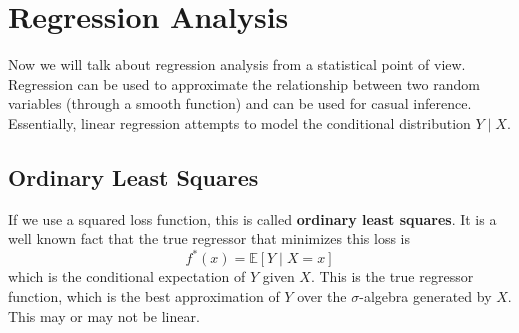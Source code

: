 \documentclass{article}
\begin{document}


\section{Regression Analysis}

    Now we will talk about regression analysis from a statistical point of view. Regression can be used to approximate the relationship between two random variables (through a smooth function) and can be used for casual inference. Essentially, linear regression attempts to model the conditional distribution $Y \mid X$. 

  \subsection{Ordinary Least Squares}

    If we use a squared loss function, this is called \textbf{ordinary least squares}. It is a well known fact that the true regressor that minimizes this loss is 
    \begin{equation}
      f^\ast (x) = \mathbb{E}[Y \mid X = x]
    \end{equation}
    which is the conditional expectation of $Y$ given $X$. This is the true regressor function, which is the best approximation of $Y$ over the $\sigma$-algebra generated by $X$. This may or may not be linear. 
\end{document}
